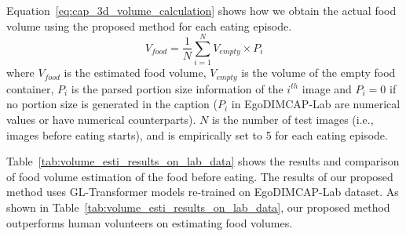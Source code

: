 \documentclass[journal]{IEEEtran}
\begin{document}
Equation~\ref{eq:cap_3d_volume_calculation} shows how we obtain the actual food volume using the proposed method for each eating episode. 
\begin{equation}\label{eq:cap_3d_volume_calculation}
    V_{food} = \frac{1}{N}\sum_{i=1}^{N}V_{empty} \times P_{i}
\end{equation}
where $V_{food}$ is the estimated food volume, $V_{empty}$ is the volume of the empty food container, $P_{i}$ is the parsed portion size information of the $i^{th}$ image and $P_{i} = 0$ if no portion size is generated in the caption ($P_{i}$ in EgoDIMCAP-Lab are numerical values or have numerical counterparts). $N$ is the number of test images (i.e., images before eating starts), and is empirically set to 5 for each eating episode.

Table~\ref{tab:volume_esti_results_on_lab_data} shows the results and comparison of food volume estimation of the food before eating. The results of our proposed method uses GL-Transformer models re-trained on EgoDIMCAP-Lab dataset. As shown in Table~\ref{tab:volume_esti_results_on_lab_data}, our proposed method outperforms human volunteers on estimating food volumes.
\end{document}
